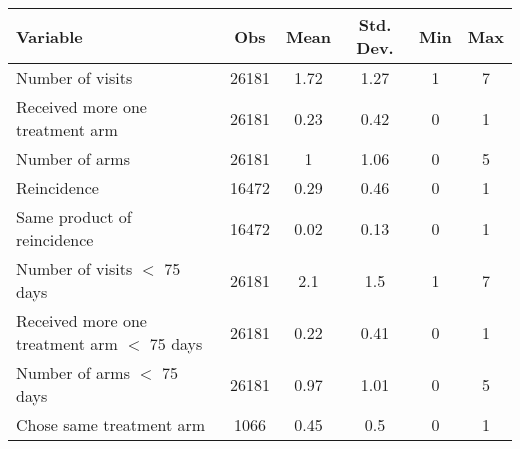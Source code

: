 \begin{tabular}{lccccc}
\toprule
Variable & Obs   & Mean  & Std. Dev. & Min   & Max \\
\midrule
\midrule
Number of visits & 26181 & 1.72  & 1.27  & 1     & 7 \\
Received more one treatment arm & 26181 & 0.23  & 0.42  & 0     & 1 \\
Number of arms & 26181 & 1     & 1.06  & 0     & 5 \\
Reincidence & 16472 & 0.29  & 0.46  & 0     & 1 \\
Same product of reincidence & 16472 & 0.02  & 0.13  & 0     & 1 \\
Number of visits $<$ 75 days & 26181 & 2.1   & 1.5   & 1     & 7 \\
Received more one treatment arm $<$ 75 days & 26181 & 0.22  & 0.41  & 0     & 1 \\
Number of arms  $<$ 75 days & 26181 & 0.97  & 1.01  & 0     & 5 \\
Chose same treatment arm & 1066  & 0.45  & 0.5   & 0     & 1 \\
\bottomrule
\bottomrule
\end{tabular}%
